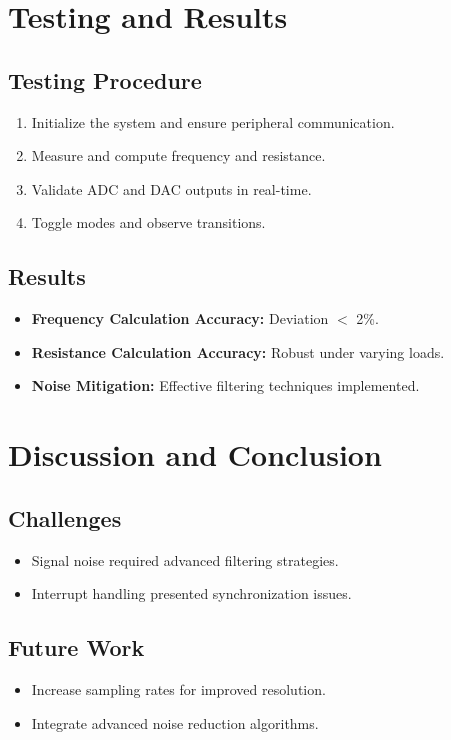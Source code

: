 \documentclass[12pt]{article}
\begin{document}
\newpage

\section{Testing and Results}
\subsection{Testing Procedure}
\begin{enumerate}[leftmargin=2em]
    \item Initialize the system and ensure peripheral communication.
    \item Measure and compute frequency and resistance.
    \item Validate ADC and DAC outputs in real-time.
    \item Toggle modes and observe transitions.
\end{enumerate}

\subsection{Results}
\begin{itemize}[leftmargin=2em]
    \item \textbf{Frequency Calculation Accuracy:} Deviation $<$ 2\%.
    \item \textbf{Resistance Calculation Accuracy:} Robust under varying loads.
    \item \textbf{Noise Mitigation:} Effective filtering techniques implemented.
\end{itemize}

\section{Discussion and Conclusion}
\subsection{Challenges}
\begin{itemize}[leftmargin=2em]
    \item Signal noise required advanced filtering strategies.
    \item Interrupt handling presented synchronization issues.
\end{itemize}

\subsection{Future Work}
\begin{itemize}[leftmargin=2em]
    \item Increase sampling rates for improved resolution.
    \item Integrate advanced noise reduction algorithms.
\end{itemize}
\end{document}
